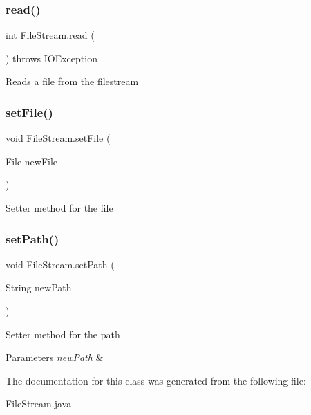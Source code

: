 \subsubsection{\texorpdfstring{read()}{read()}}
{\footnotesize\ttfamily int File\+Stream.\+read (\begin{DoxyParamCaption}{ }\end{DoxyParamCaption}) throws I\+O\+Exception\hspace{0.3cm}{\ttfamily [inline]}}

Reads a file from the filestream \mbox{\label{class_file_stream_a0885a5602d71d48e503d6b19ac40bc17}} 
\subsubsection{\texorpdfstring{set\+File()}{setFile()}}
{\footnotesize\ttfamily void File\+Stream.\+set\+File (\begin{DoxyParamCaption}\item[{File}]{new\+File }\end{DoxyParamCaption})\hspace{0.3cm}{\ttfamily [inline]}}

Setter method for the file \mbox{\label{class_file_stream_a10b53b74a061e2bedc6fadbfaa5660b5}} 
\subsubsection{\texorpdfstring{set\+Path()}{setPath()}}
{\footnotesize\ttfamily void File\+Stream.\+set\+Path (\begin{DoxyParamCaption}\item[{String}]{new\+Path }\end{DoxyParamCaption})\hspace{0.3cm}{\ttfamily [inline]}}

Setter method for the path 
\begin{DoxyParams}{Parameters}
{\em new\+Path} & \\
\hline
\end{DoxyParams}


The documentation for this class was generated from the following file\+:\begin{DoxyCompactItemize}
\item 
File\+Stream.\+java\end{DoxyCompactItemize}
